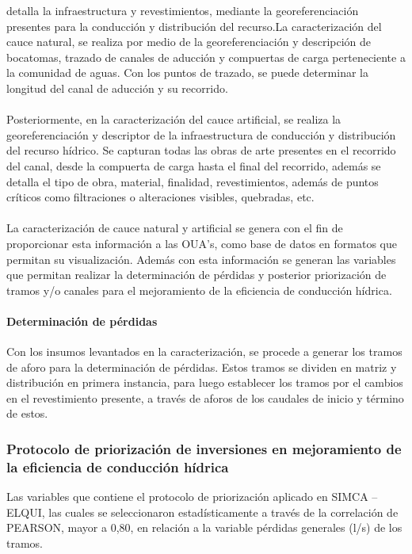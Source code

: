 \documentclass[]{article}
\begin{document}
detalla la infraestructura y revestimientos, mediante la georeferenciación  presentes para la conducción y distribución del recurso.La caracterización del cauce natural, se realiza por medio de la georeferenciación y descripción de bocatomas, trazado de canales de aducción y compuertas de carga perteneciente a la comunidad de aguas. Con los puntos de trazado, se puede determinar la longitud del canal de aducción y su recorrido.\\
\\
Posteriormente, en la caracterización del cauce artificial, se realiza la georeferenciación y descriptor de la infraestructura de conducción y distribución del recurso hídrico. Se capturan todas las obras de arte presentes en el recorrido del canal, desde la compuerta de carga hasta el final del recorrido, además se detalla el tipo de obra, material, finalidad, revestimientos, además de puntos críticos como filtraciones o alteraciones visibles, quebradas, etc.\\
\\
La caracterización de cauce natural y artificial se genera con el fin de proporcionar esta información a las OUA’s, como base de datos en formatos que permitan su visualización. Además con esta información se generan las variables que permitan realizar la determinación de pérdidas y posterior priorización de tramos y/o canales para el mejoramiento de la eficiencia de conducción hídrica.\\

\paragraph{Determinación de pérdidas}


Con los insumos levantados en la caracterización, se procede a generar los tramos de aforo para la determinación de pérdidas. Estos tramos se dividen en matriz y distribución en primera instancia, para luego establecer los tramos por el cambios en el revestimiento presente, a través de aforos de los caudales de inicio y término de estos.



\subsubsection{Protocolo de priorización de inversiones en mejoramiento de la eficiencia de conducción hídrica}

Las variables que contiene el protocolo de priorización aplicado en SIMCA – ELQUI, las cuales se seleccionaron estadísticamente a través de la correlación de PEARSON, mayor a 0,80, en relación a la variable pérdidas generales (l/s) de los tramos.
\end{document}
